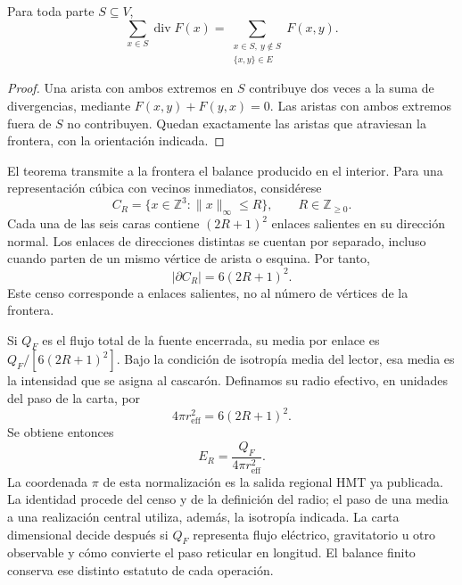 \begin{theorem}
\label{vi:vi:thm:gauss}
Para toda parte $S\subseteq V$,
\begin{equation}
 \sum_{x\in S}\operatorname{div}F(x)
 =\sum_{\substack{x\in S,\ y\notin S\\\{x,y\}\in E}}F(x,y).
 \label{vi:vi:eq:gauss}
\end{equation}
\end{theorem}
\begin{proof}
Una arista con ambos extremos en $S$ contribuye dos veces a la
suma de divergencias, mediante $F(x,y)+F(y,x)=0$. Las aristas
con ambos extremos fuera de $S$ no contribuyen. Quedan
exactamente las aristas que atraviesan la frontera, con la
orientación indicada.
\end{proof}

El teorema transmite a la frontera el balance producido en el
interior. Para una representación cúbica con vecinos inmediatos,
considérese
\[
 C_R=\{x\in\mathbb Z^3:\|x\|_\infty\leq R\},
 \qquad R\in\mathbb Z_{\geq0}.
\]
Cada una de las seis caras contiene $(2R+1)^2$ enlaces
salientes en su dirección normal. Los enlaces de direcciones
distintas se cuentan por separado, incluso cuando parten de
un mismo vértice de arista o esquina. Por tanto,
\begin{equation}
 |\partial C_R|=6(2R+1)^2.
 \label{vi:vi:eq:frontera-cubica}
\end{equation}
Este censo corresponde a enlaces salientes, no al número de
vértices de la frontera.

Si $Q_F$ es el flujo total de la fuente encerrada, su media
por enlace es $Q_F/[6(2R+1)^2]$. Bajo la condición de isotropía
media del lector, esa media es la intensidad que se asigna al
cascarón. Definamos su radio efectivo, en unidades del paso de
la carta, por
\begin{equation}
 4\pi r_{\mathrm{eff}}^2=6(2R+1)^2.
 \label{vi:vi:eq:radio-efectivo}
\end{equation}
Se obtiene entonces
\begin{equation}
 E_R=\frac{Q_F}{4\pi r_{\mathrm{eff}}^2}.
 \label{vi:vi:eq:inverso-area}
\end{equation}
La coordenada $\pi$ de esta normalización es la salida regional
HMT ya publicada. La identidad procede del censo y de la
definición del radio; el paso de una media a una realización
central utiliza, además, la isotropía indicada. La carta
dimensional decide después si $Q_F$ representa flujo eléctrico,
gravitatorio u otro observable y cómo convierte el paso
reticular en longitud. El balance finito conserva ese
distinto estatuto de cada operación.

